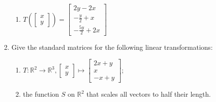 \documentclass[12pt]{amsart}
\newcommand{\R}{\mathbb{R}}
\begin{document}
\begin{enumerate}
{\begin{enumerate}
\begin{itemize}
            $-\frac{1}{4}(T(\left[\begin{matrix} 3 \\ 2 \end{matrix}\right])-3T(\left[\begin{matrix} 1 \\ 2 \end{matrix}\right]))=T(\left[\begin{matrix} 0 \\ 1 \end{matrix}\right])$\\
            $-\frac{1}{4}(\left[\begin{matrix} -2 \\ 2 \\ 1 \end{matrix}\right]+\left[\begin{matrix} -6 \\ 0 \\ 9 \end{matrix}\right])=T(\left[\begin{matrix} 0 \\ 1 \end{matrix}\right])=\left[\begin{matrix} 2 \\ -\frac{1}{2} \\ -\frac{5}{2} \end{matrix}\right]$\\
    \end{itemize}
      \item
        $T(\left[\begin{matrix} x \\ y \end{matrix}\right])=\left[\begin{matrix} 2y-2x \\ -\frac{y}{2}+x \\ -\frac{5y}{2}+2x \end{matrix}\right]$
  \end{enumerate}
}


\item
 Give the standard matrices for the following linear transformations:
\begin{enumerate}
\item $T:\R^2\to\R^3, \left[\begin{matrix} x \\ y \end{matrix}\right]\mapsto \left[\begin{matrix} 2x+y \\ x \\ -x+y \end{matrix}\right]$;
\item the function $S$ on $\R^2$ that scales all vectors to half their length.



\end{enumerate}
\end{enumerate}
\end{document}
